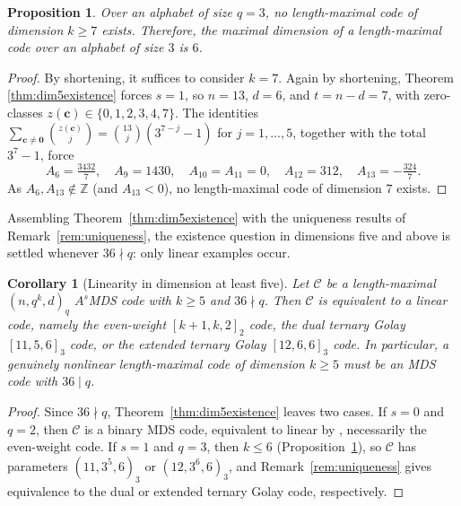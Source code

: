 \documentclass[12pt, letterpaper]{article}
\theoremstyle{plain}
\newtheorem{proposition}[theorem]{Proposition}
\newtheorem{corollary}[theorem]{Corollary}
\theoremstyle{definition}
\begin{document}
	\begin{proposition}\label{prop:q3_dimension}
		Over an alphabet of size $q=3$, no length-maximal code of dimension $k \ge 7$ exists. Therefore, the maximal dimension of a length-maximal code over an alphabet of size $3$ is $6$.
	\end{proposition}

	\begin{proof}
		By shortening, it suffices to consider $k=7$. Again by shortening, Theorem \ref{thm:dim5existence} forces $s = 1$, so $n = 13$, $d = 6$, and $t = n-d = 7$, with zero-classes $z(\mathbf c) \in \{0,1,2,3,4,7\}$. The identities $\sum_{\mathbf c \ne \mathbf 0}\binom{z(\mathbf c)}{j} = \binom{13}{j}(3^{7-j}-1)$ for $j = 1,\dots,5$, together with the total $3^7-1$, force
		\[
		A_6 = \tfrac{3432}{7}, \quad A_9 = 1430, \quad A_{10} = A_{11} = 0, \quad A_{12} = 312, \quad A_{13} = -\tfrac{324}{7}.
		\]
		As $A_6, A_{13} \notin \mathbb{Z}$ (and $A_{13} < 0$), no length-maximal code of dimension $7$ exists.
	\end{proof}

	Assembling Theorem~\ref{thm:dim5existence} with the uniqueness results of Remark~\ref{rem:uniqueness}, the existence question in dimensions five and above is settled whenever $36 \nmid q$: only linear examples occur.

	\begin{corollary}[Linearity in dimension at least five]\label{cor:dim5_linearity}
		Let $\mathcal{C}$ be a length-maximal $(n, q^k, d)_q$ $A^s$MDS code with $k \ge 5$ and $36 \nmid q$. Then $\mathcal{C}$ is equivalent to a linear code, namely the even-weight $[k+1, k, 2]_2$ code, the dual ternary Golay $[11,5,6]_3$ code, or the extended ternary Golay $[12,6,6]_3$ code. In particular, a genuinely nonlinear length-maximal code of dimension $k \ge 5$ must be an MDS code with $36 \mid q$.
	\end{corollary}

	\begin{proof}
		Since $36 \nmid q$, Theorem~\ref{thm:dim5existence} leaves two cases. If $s = 0$ and $q = 2$, then $\mathcal{C}$ is a binary MDS code, equivalent to linear by \cite[Theorem~4]{Alderson2020}, necessarily the even-weight code. If $s = 1$ and $q = 3$, then $k \le 6$ (Proposition~\ref{prop:q3_dimension}), so $\mathcal{C}$ has parameters $(11, 3^5, 6)_3$ or $(12, 3^6, 6)_3$, and Remark~\ref{rem:uniqueness} gives equivalence to the dual or extended ternary Golay code, respectively.
	\end{proof}
\end{document}
